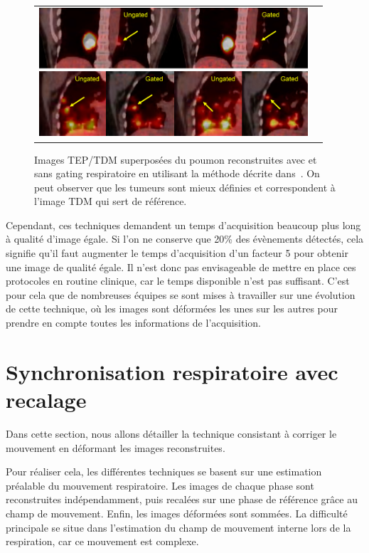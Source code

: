 \begin{figure}[h!]
	\begin{center}
		\begin{tabular}{c c}
			\includegraphics[width=10cm]{images/chang2010}
		\end{tabular}
	\end{center}
	\caption{Images TEP/TDM superposées du poumon reconstruites avec et sans gating respiratoire en utilisant la méthode décrite dans~\cite{GuopingChang2010Implementation}. On peut observer que les tumeurs sont mieux définies et correspondent à l'image TDM qui sert de référence.} 
	\label{fig:chang2010}
\end{figure}

Cependant, ces techniques demandent un temps d'acquisition beaucoup plus long à qualité d'image égale. Si l'on ne conserve que 20\% des évènements détectés, cela signifie qu'il faut augmenter le temps d'acquisition d'un facteur 5 pour obtenir une image de qualité égale. Il n'est donc pas envisageable de mettre en place ces protocoles en routine clinique, car le temps disponible n'est pas suffisant. C'est pour cela que de nombreuses équipes se sont mises à travailler sur une évolution de cette technique, où les images sont déformées les unes sur les autres pour prendre en compte toutes les informations de l'acquisition.

\section{Synchronisation respiratoire avec recalage}
\label{lab:corrPostRecon}

Dans cette section, nous allons détailler la technique consistant à corriger  le mouvement en déformant les images reconstruites.

Pour réaliser cela, les différentes techniques se basent sur une estimation préalable du mouvement respiratoire. Les images de chaque phase sont reconstruites indépendamment, puis recalées sur une phase de référence grâce au champ de mouvement. Enfin, les images déformées sont sommées. La difficulté principale se situe dans l'estimation du champ de mouvement interne lors de la respiration, car ce mouvement est complexe.

